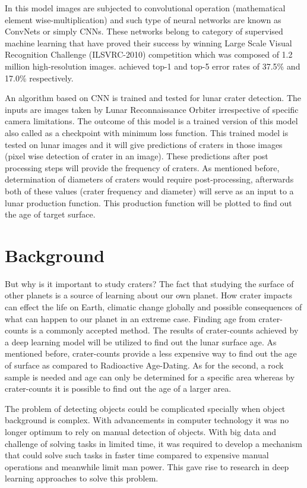 \documentclass[11pt]{article}
\begin{document}
In this model images are subjected to convolutional operation (mathematical element wise-multiplication) and such type of neural networks are known as ConvNets or simply CNNs. These networks belong to category of supervised machine learning that have proved their success by winning Large Scale Visual Recognition Challenge (ILSVRC-2010) competition which was composed of 1.2 million high-resolution images. \cite{krizhevsky2012imagenet} achieved top-1 and top-5 error rates of 37.5\% and 17.0\% respectively.

An algorithm based on CNN is trained and tested for lunar crater detection. The inputs are images taken by Lunar Reconnaissance Orbiter irrespective of specific camera limitations. The outcome of this model is a trained version of this model also called as a checkpoint with minimum loss function. This trained model is tested on lunar images and it will give predictions of craters in those images (pixel wise detection of crater in an image). These predictions after post processing steps will provide the frequency of craters. As mentioned before, determination of diameters of craters would require post-processing, afterwards both of these values (crater frequency and diameter) will serve as an input to a lunar production function. This production function will be plotted to find out the age of target surface.


\section{Background}
But why is it important to study craters? The fact that studying the surface of other planets is a source of learning about our own planet. How crater impacts can effect the life on Earth, climatic change globally and possible consequences of what can happen to our planet in an extreme case. Finding age from crater-counts is a commonly accepted method. The results of crater-counts achieved by a deep learning model will be utilized to find out the lunar surface age. As mentioned before, crater-counts provide a less expensive way to find out the age of surface as compared to Radioactive Age-Dating. As for the second, a rock sample is needed and age can only be determined for a specific area whereas by crater-counts it is possible to find out the age of a larger area.

The problem of detecting objects could be complicated specially when object background is complex. With advancements in computer technology it was no longer optimum to rely on manual detection of objects. With big data and challenge of solving tasks in limited time, it was required to develop a mechanism that could solve such tasks in faster time compared to expensive manual operations and meanwhile limit man power. This gave rise to research in deep learning approaches to solve this problem.
\end{document}
